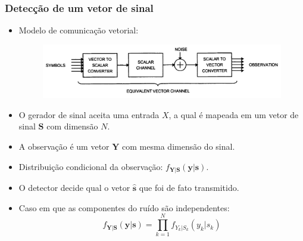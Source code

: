 \begin{frame}
	\frametitle{Detecção de um vetor de sinal}

	\begin{itemize}
	    \item Modelo de comunicação vetorial:
	    \begin{figure}[t]	
	      \begin{center}
		\includegraphics[width=0.8\columnwidth]{figs/detec_04}
	      \end{center}
	    \end{figure}
	    \item O gerador de sinal aceita uma entrada $X$, a qual é mapeada em um vetor de sinal $\mathbf{S}$ com dimensão $N$.
	    \item A observação é um vetor $\mathbf{Y}$ com mesma dimensão do sinal.
	    \item Distribuição condicional da observação: $f_{\mathbf{Y}|\mathbf{S}}(\mathbf{y}|\mathbf{s})$.
	    \item O detector decide qual o vetor $\hat{\mathbf{s}}$ que foi de fato transmitido.
	    \item Caso em que as componentes do ruído são independentes:
	    \begin{equation*}
		f_{\mathbf{Y}|\mathbf{S}}(\mathbf{y}|\mathbf{s}) = \prod_{k=1}^N f_{Y_k|S_k}(y_k|s_k)
	    \end{equation*}

	\end{itemize}			
\end{frame}

